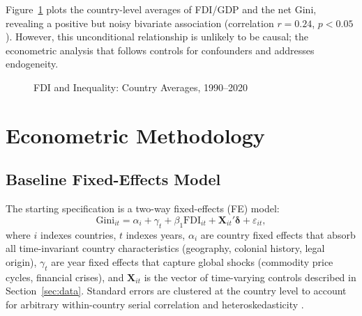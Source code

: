 \documentclass[12pt,a4paper]{article}
\begin{document}
Figure~\ref{fig:scatter} plots the country-level averages of FDI/GDP and the net Gini, revealing a positive but noisy bivariate association (correlation $r = 0.24$, $p < 0.05$).  However, this unconditional relationship is unlikely to be causal; the econometric analysis that follows controls for confounders and addresses endogeneity.

\begin{figure}[H]
\centering
\caption{FDI and Inequality: Country Averages, 1990--2020}
\label{fig:scatter}
\end{figure}


\section{Econometric Methodology}\label{sec:method}

\subsection{Baseline Fixed-Effects Model}

The starting specification is a two-way fixed-effects (FE) model:
\begin{equation}\label{eq:fe}
  \text{Gini}_{it} = \alpha_i + \gamma_t + \beta_1 \text{FDI}_{it} + \mathbf{X}_{it}'\boldsymbol{\delta} + \varepsilon_{it},
\end{equation}
where $i$ indexes countries, $t$ indexes years, $\alpha_i$ are country fixed effects that absorb all time-invariant country characteristics (geography, colonial history, legal origin), $\gamma_t$ are year fixed effects that capture global shocks (commodity price cycles, financial crises), and $\mathbf{X}_{it}$ is the vector of time-varying controls described in Section~\ref{sec:data}.  Standard errors are clustered at the country level to account for arbitrary within-country serial correlation and heteroskedasticity \citep{Bertrand2004}.
\end{document}
